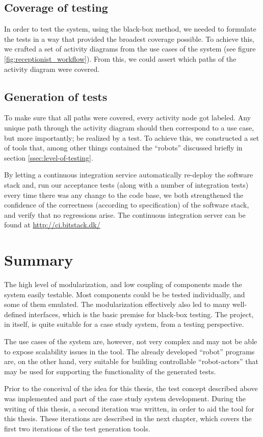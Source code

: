 \subsection{Coverage of testing}
In order to test the system, using the black-box method, we needed to formulate the tests in a way that provided the broadest coverage possible. To achieve this, we crafted a set of activity diagrams from the use cases of the system (see figure \ref{fig:receptionist_workflow}). From this, we could assert which paths of the activity diagram were covered.

\subsection{Generation of tests}
To make sure that all paths were covered, every activity node got labeled. Any unique path through the activity diagram should then correspond to a use case, but more importantly; be realized by a test. To achieve this, we constructed a set of tools that, among other things contained the ``robots'' discussed briefly in section \ref{ssec:level-of-testing}.\medskip

\noindent By letting a continuous integration service automatically re-deploy the software stack and, run our acceptance tests (along with a number of integration tests) every time there was any change to the code base, we both strengthened the confidence of the correctness (according to specification) of the software stack, and verify that no regressions arise. The continuous integration server can be found at \url{http://ci.bitstack.dk/}

\section{Summary}
The high level of modularization, and low coupling of components made the system easily testable. Most components could be be tested individually, and some of them emulated. The modularization effectively also led to many well-defined interfaces, which is the basic premise for black-box testing. The project, in itself, is quite suitable for a case study system, from a testing perspective.\medskip

\noindent The use cases of the system are, however, not very complex and may not be able to expose scalability issues in the tool. The already developed ``robot'' programs are, on the other hand, very suitable for building controllable ``robot-actors'' that may be used for supporting the functionality of the generated tests.\medskip

\noindent Prior to the conceival of the idea for this thesis, the test concept described above was implemented and part of the case study system development. During the writing of this thesis, a second iteration was written, in order to aid the tool for this thesis. These iterations are described in the next chapter, which covers the first two iterations of the test generation tools.